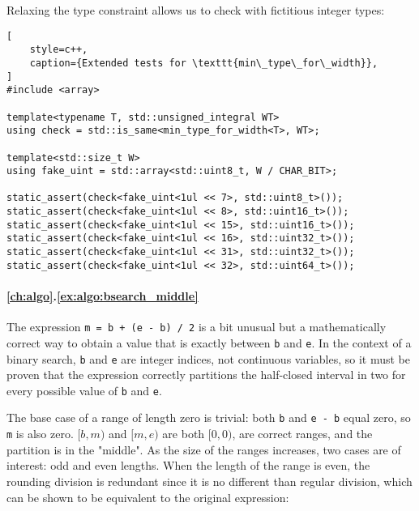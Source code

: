 Relaxing the type constraint allows us to check with fictitious integer types:

\begin{lstlisting}[
    style=c++,
    caption={Extended tests for \texttt{min\_type\_for\_width}},
]
#include <array>

template<typename T, std::unsigned_integral WT>
using check = std::is_same<min_type_for_width<T>, WT>;

template<std::size_t W>
using fake_uint = std::array<std::uint8_t, W / CHAR_BIT>;

static_assert(check<fake_uint<1ul << 7>, std::uint8_t>());
static_assert(check<fake_uint<1ul << 8>, std::uint16_t>());
static_assert(check<fake_uint<1ul << 15>, std::uint16_t>());
static_assert(check<fake_uint<1ul << 16>, std::uint32_t>());
static_assert(check<fake_uint<1ul << 31>, std::uint32_t>());
static_assert(check<fake_uint<1ul << 32>, std::uint64_t>());
\end{lstlisting}

\paragraph{\ref{ch:algo}.\ref{ex:algo:bsearch_middle}}

The expression \texttt{m = b + (e - b) / 2} is a bit unusual but a
mathematically correct way to obtain a value that is exactly between \texttt{b}
and \texttt{e}.  In the context of a binary search, \texttt{b} and \texttt{e}
are integer indices, not continuous variables, so it must be proven that the
expression correctly partitions the half-closed interval in two for every
possible value of \texttt{b} and \texttt{e}.

The base case of a range of length zero is trivial: both \texttt{b} and
\texttt{e - b} equal zero, so \texttt{m} is also zero\footnotemark.  $[b, m)$
and $[m, e)$ are both $[0, 0)$, are correct ranges, and the partition is in the
"middle".  As the size of the ranges increases, two cases are of interest: odd
and even lengths.  When the length of the range is even, the rounding division
is redundant since it is no different than regular division, which can be shown
to be equivalent to the original expression:

\footnotetext{
    Recall that, as mentioned in section \secref{subsec:algo:ranges}, the length
    calculation for half-open ranges is very simple: $|[b, e)| = e - b$.}

